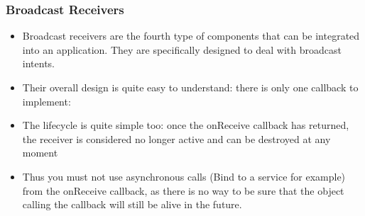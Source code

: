 \begin{frame}
  \frametitle{Broadcast Receivers}
  \begin{itemize}
  \item Broadcast receivers are the fourth type of components that can
    be integrated into an application. They are specifically designed
    to deal with broadcast intents.
  \item Their overall design is quite easy to understand: there is
    only one callback to implement: 
  \item The lifecycle is quite simple too: once the onReceive callback
    has returned, the receiver is considered no longer active and can
    be destroyed at any moment
  \item Thus you must not use asynchronous calls (Bind to a service
    for example) from the onReceive callback, as there is no way
    to be sure that the object calling the callback will still be alive
    in the future.
  \end{itemize}
\end{frame}
